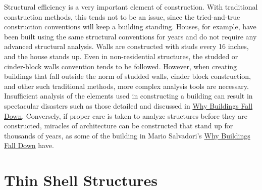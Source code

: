 \documentclass{thesis}
\begin{document}
Structural efficiency is a very important element of construction.  With traditional construction methods, this tends not to be an issue, since
the tried-and-true construction conventions will keep a building standing.  Houses, for example, have been built using the same structural
conventions for years and do not require any advanced structural analysis.  Walls are constructed with studs every 16 inches, and the house
stands up.  Even in non-residential structures, the studded or cinder-block walls convention tends to be followed.  However, when creating
buildings that fall outside the norm of studded walls, cinder block construction, and other such traditional methods, more complex analysis
tools are necessary.  Insufficient analysis of the elements used in constructing a building can result in spectacular disasters such as those
detailed and discussed in \underline{Why Buildings Fall Down}\cite{levy92falldown}.  Conversely, if proper care is taken to analyze structures
before they are constructed, miracles of architecture can be constructed that stand up for thousands of years, as some of the building in
Mario Salvadori's \underline{Why Buildings Fall Down}\cite{salvadori80standup} have.


\section{Thin Shell Structures} \label{thinshell}
\end{document}
